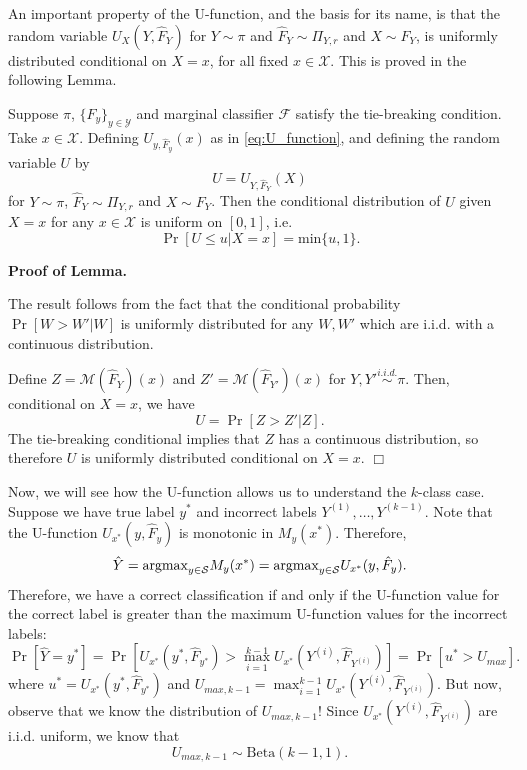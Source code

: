 An important property of the U-function, and the basis for its name,
is that the random variable $U_X(Y, \hat{F}_Y)$ for $Y \sim \pi$ and
$\hat{F}_Y \sim \Pi_{Y, r}$ and $X \sim F_Y$, is uniformly distributed
conditional on $X=x$, for all fixed $x \in \mathcal{X}$.  This is
proved in the following Lemma.

\begin{lemma}\label{lemma:U_function}
Suppose $\pi$, $\{F_y\}_{y \in \mathcal{Y}}$ and marginal classifier
$\mathcal{F}$ satisfy the tie-breaking condition.  Take $x \in \mathcal{X}$.  Defining
$U_{y,\hat{F}_y}(x)$ as in \eqref{eq:U_function}, and defining the
random variable $U$ by
\[U = U_{Y, \hat{F}_Y}(X)\]
for $Y \sim \pi$, $\hat{F}_Y \sim \Pi_{Y, r}$ and $X \sim F_Y$.  Then
the conditional distribution of $U$ given $X = x$ for any $x \in
\mathcal{X}$ is uniform on $[0,1]$, i.e.
\[
\Pr[U \leq u|X =x] = \text{min}\{u, 1\}.
\]
\end{lemma}

\textbf{Proof of Lemma.}


The result follows from the fact that the conditional probability
$\Pr[W > W'|W]$ is uniformly distributed for any $W, W'$ which are
i.i.d. with a continuous distribution.  

Define $Z = \mathcal{M}(\hat{F}_{Y})(x)$ and $Z' =
\mathcal{M}(\hat{F}_{Y'})(x)$ for $Y, Y' \stackrel{i.i.d.}{\sim} \pi$.
Then, conditional on $X = x$, we have
\[
U = \Pr[Z > Z'|Z].
\]
The tie-breaking conditional implies that $Z$ has a continuous
distribution, so therefore $U$ is uniformly distributed conditional on
$X = x$.  $\Box$


Now, we will see how the U-function allows us to understand the
$k$-class case.  Suppose we have true label $y^*$ and incorrect labels
$Y^{(1)},\hdots, Y^{(k-1)}$.  Note that the U-function
$U_{x^*}(y, \hat{F}_y)$ is monotonic in $M_y(x^*)$.  Therefore,
\[
\hat{Y} = \text{argmax}_{y \in \mathcal{S}} M_y(x^*) = \text{argmax}_{y \in \mathcal{S}} U_{x^*}(y, \hat{F}_y).
\]
Therefore, we have a correct classification if and only if the U-function value for the correct label
is greater than the maximum U-function values for the incorrect labels:
\[
\Pr[\hat{Y} = y^*] = \Pr[U_{x^*}(y^*, \hat{F}_{y^*}) > \max_{i=1}^{k-1} U_{x^*}(Y^{(i)}, \hat{F}_{Y^{(i)}})] =  \Pr[u^* > U_{max}].
\]
where $u^* = U_{x^*}(y^*, \hat{F}_{y^*})$ and $U_{max, k-1}
= \max_{i=1}^{k-1} U_{x^*}(Y^{(i)}, \hat{F}_{Y^{(i)}})$.  But now,
observe that we know the distribution of $U_{max, k-1}$!  Since
$U_{x^*}(Y^{(i)}, \hat{F}_{Y^{(i)}})$ are i.i.d. uniform, we know that
\begin{equation}\label{eq:umax_beta}
U_{max, k-1} \sim \text{Beta}(k-1, 1). 
\end{equation}

